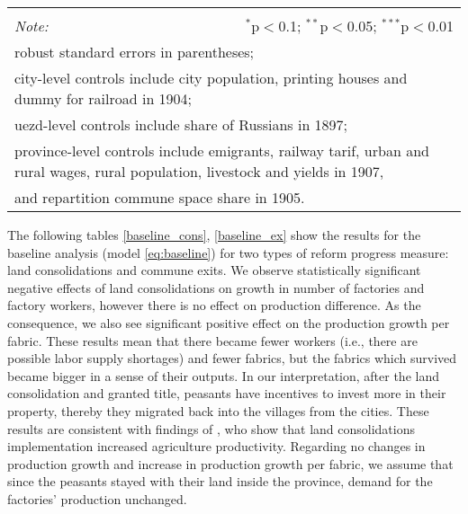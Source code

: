 \documentclass[a4paper, 12pt]{article}
\begin{document}
\begin{table}[!htbp]
{\begin{tabular}{@{\extracolsep{5pt}}lcccccc}
\hline 
\hline \\[-1.8ex] 
\textit{Note:}  & \multicolumn{6}{r}{$^{*}$p$<$0.1; $^{**}$p$<$0.05; $^{***}$p$<$0.01} \\ 
\multicolumn{7}{l}{robust standard errors in parentheses;} \\
\multicolumn{7}{l}{city-level controls include city population, printing houses and dummy for railroad in 1904;} \\
\multicolumn{7}{l}{uezd-level controls include share of Russians in 1897;}\\
\multicolumn{7}{l}{province-level controls include emigrants, railway tarif, urban and rural wages, rural population, livestock and yields in 1907,}\\
\multicolumn{7}{l}{ and repartition commune space share in 1905.}
\end{tabular} 
}
\end{table}

\noindent The following tables \ref{baseline_cons}, \ref{baseline_ex} show the results for the baseline analysis (model \ref{eq:baseline}) for two types of reform progress measure: land consolidations and commune exits. We observe statistically significant negative effects of land consolidations on growth in number of factories and factory workers, however there is no effect on production difference. As the consequence, we also see significant positive effect on the production growth per fabric. These results mean that there became fewer workers (i.e., there are possible labor supply shortages) and fewer fabrics, but the fabrics which survived became bigger in a sense of their outputs. In our interpretation, after the land consolidation and granted title, peasants have incentives to invest more in their property, thereby they migrated back into the villages from the cities. These results are consistent with findings of \cite{castaneda2019stolypin}, who show that land consolidations implementation increased agriculture productivity. Regarding no changes in production growth and increase in production growth per fabric, we assume that since the peasants stayed with their land inside the province, demand for the factories' production unchanged.
\\
\end{document}

